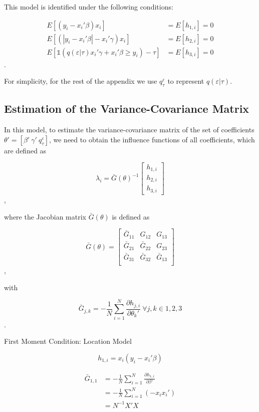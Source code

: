 \documentclass[
  authoryear,
  review,
  1p]{elsarticle}
\begin{document}
This model is identified under the following conditions:

\[\begin{aligned}
  E[(y_i-x_i'\beta)x_i ]  &= E[h_{1,i}]=0 \\
  E[ (|y_i-x_i'\beta|-x_i' \gamma) x_i ] &=E[h_{2,i}]=0 \\
  E\left[  \mathbb{1}\left( q(\varepsilon|\tau) x_i'\gamma +x_i'\beta\geq  y_i  \right) - \tau \right] 
   &=E[h_{3,i}]=0 
\end{aligned}
\].

For simplicity, for the rest of the appendix we use
\(q^\varepsilon_\tau\) to represent \(q(\varepsilon |\tau)\).

\hypertarget{estimation-of-the-variance-covariance-matrix}{%
\subsection{Estimation of the Variance-Covariance
Matrix}\label{estimation-of-the-variance-covariance-matrix}}

In this model, to estimate the variance-covariance matrix of the set of
coefficients \(\theta'=[\beta' \ \gamma' \ q^\varepsilon_\tau]\), we
need to obtain the influence functions of all coefficients, which are
defined as

\[\lambda_i = \bar G(\theta)^{-1}
\begin{bmatrix}
h_{1,i} \\
h_{2,i} \\
h_{3,i}
\end{bmatrix}
\],

where the Jacobian matrix \(\bar G(\theta)\) is defined as

\[\bar G(\theta) = \begin{bmatrix}
\bar G_{11} & G_{12} & G_{13} \\
\bar G_{21} & \bar G_{22} & G_{23} \\
\bar G_{31} & \bar G_{32} & \bar G_{13} \\
\end{bmatrix}
\],

with

\[\bar G_{j,k} = - \frac 1 N \sum_{i=1}^N \frac{\partial h_{j,i}}{\partial \theta_k'} \ \forall j,k \in 1,2,3
\].

First Moment Condition: Location Model

\[h_{1,i}=x_i(y_i-x_i'\beta)\]

\[\begin{aligned}
\bar G_{1,1} &=- \frac{1}{N} \sum_{i=1}^N \frac{\partial h_{1,i}}{\partial \beta'} \\
             &=- \frac{1}{N} \sum_{i=1}^N (-x_i x_i') \\
             &= N^{-1} X'X
\end{aligned}
\]
\end{document}
